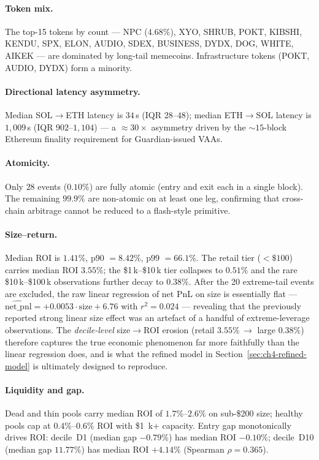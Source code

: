 \documentclass[11pt,a4paper]{article}
\newcommand{\SolEth}{SOL$\to$ETH}
\newcommand{\EthSol}{ETH$\to$SOL}
\begin{document}
\paragraph{Token mix.} The top-15 tokens by count --- NPC ($4.68\%$), XYO,
SHRUB, POKT, KIBSHI, KENDU, SPX, ELON, AUDIO, SDEX, BUSINESS, DYDX, DOG,
WHITE, AIKEK --- are dominated by long-tail memecoins. Infrastructure
tokens (POKT, AUDIO, DYDX) form a minority.

\paragraph{Directional latency asymmetry.} Median \SolEth{} latency is
$34$\,s (IQR $28$--$48$); median \EthSol{} latency is $1{,}009$\,s (IQR
$902$--$1{,}104$) --- a $\approx\!30\times$ asymmetry driven by the
$\sim\!15$-block Ethereum finality requirement for Guardian-issued VAAs.

\paragraph{Atomicity.} Only $28$ events ($0.10\%$) are fully atomic (entry
and exit each in a single block). The remaining $99.9\%$ are non-atomic on
at least one leg, confirming that cross-chain arbitrage cannot be reduced
to a flash-style primitive.

\paragraph{Size--return.} Median ROI is $1.41\%$, p90 $=8.42\%$, p99
$=66.1\%$. The retail tier ($<\$100$) carries median ROI $3.55\%$; the
\$1\,k--\$10\,k tier collapses to $0.51\%$ and the rare
\$10\,k--\$100\,k observations further decay to $0.38\%$. After the
20 extreme-tail events are excluded, the raw linear regression of
net PnL on size is essentially flat ---
$\widehat{\text{net\_pnl}} = +0.0053\cdot\text{size} + 6.76$ with
$r^{2}\!=\!0.024$ --- revealing that the previously reported strong
linear size effect was an artefact of a handful of extreme-leverage
observations. The \emph{decile-level} size$\to$ROI erosion (retail
$3.55\%\,\to$ large $0.38\%$) therefore captures the true economic
phenomenon far more faithfully than the linear regression does, and
is what the refined model in Section~\ref{sec:ch4-refined-model} is
ultimately designed to reproduce.

\paragraph{Liquidity and gap.} Dead and thin pools carry median ROI of
$1.7\%$--$2.6\%$ on sub-\$200 size; healthy pools cap at $0.4\%$--$0.6\%$
ROI with \$1~k+ capacity. Entry gap monotonically drives ROI: decile~D1
(median gap $-0.79\%$) has median ROI $-0.10\%$; decile~D10 (median gap
$11.77\%$) has median ROI $+4.14\%$ (Spearman $\rho=0.365$).
\end{document}
